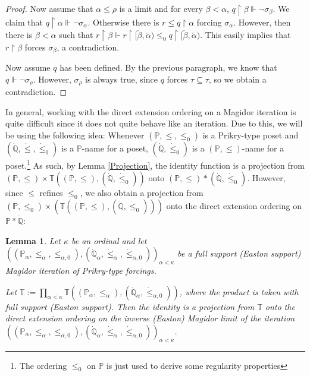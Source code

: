 \documentclass[a4paper]{amsart}
\theoremstyle{definition}
\theoremstyle{remark}
\theoremstyle{plain}
\newtheorem{mylem}[mydef]{Lemma}
\numberwithin{mydef}{section}
\newcommand{\dP}{\mathbb{P}}
\newcommand{\dQ}{\mathbb{Q}}
\newcommand{\dT}{\mathbb{T}}
\newcommand{\uhr}{\upharpoonright}
\begin{document}
\begin{proof}
		Now assume that $\alpha\leq\rho$ is a limit and for every $\beta<\alpha$, $q\uhr\beta\Vdash\neg\sigma_{\beta}$. We claim that $q\uhr\alpha\Vdash\neg\sigma_{\alpha}$. Otherwise there is $r\leq q\uhr\alpha$ forcing $\sigma_{\alpha}$. However, then there is $\beta<\alpha$ such that $r\uhr\beta\Vdash r\uhr[\check{\beta},\check{\alpha})\leq_0 q\uhr[\check{\beta},\check{\alpha})$. This easily implies that $r\uhr\beta$ forces $\sigma_{\beta}$, a contradiction.
		
		Now assume $q$ has been defined. By the previous paragraph, we know that $q\Vdash\neg\sigma_{\rho}$. However, $\sigma_{\rho}$ is always true, since $q$ forces $\tau\subseteq\tau$, so we obtain a contradiction.
	\end{proof}
	
	In general, working with the direct extension ordering on a Magidor iteration is quite difficult since it does not quite behave like an iteration. Due to this, we will be using the following idea: Whenever $(\dP,\leq,\leq_0)$ is a Prikry-type poset and $(\dot{\dQ},\dot{\leq},\dot{\leq}_0)$ is a $\dP$-name for a poset, $(\dot{\dQ},\dot{\leq}_0)$ is a $(\dP,\leq)$-name for a poset.\footnote{The ordering $\leq_0$ on $\dP$ is just used to derive some regularity properties} As such, by Lemma \ref{Projection}, the identity function is a projection from $(\dP,\leq)\times\dT((\dP,\leq),(\dot{\dQ},\dot{\leq}_0))$ onto $(\dP,\leq)*(\dot{\dQ},\dot{\leq}_0)$. However, since $\leq$ refines $\leq_0$, we also obtain a projection from $(\dP,\leq_0)\times(\dT((\dP,\leq),(\dot{\dQ},\dot{\leq}_0)))$ onto the direct extension ordering on $\dP*\dot{\dQ}$:
	
	\begin{mylem}\label{TermspaceMagidor}
		Let $\kappa$ be an ordinal and let  $((\dP_{\alpha},\leq_{\alpha},\leq_{\alpha,0}),(\dot{\dQ}_{\alpha},\dot{\leq}_{\alpha},\dot{\leq}_{\alpha,0}))_{\alpha<\kappa}$ be a full support (Easton support) Magidor iteration of Prikry-type forcings.
		
		Let $\dT:=\prod_{\alpha<\kappa}\dT((\dP_{\alpha},\leq_{\alpha}),(\dot{\dQ}_{\alpha},\dot{\leq}_{\alpha,0}))$, where the product is taken with full support (Easton support). Then the identity is a projection from $\dT$ onto the direct extension ordering on the inverse (Easton) Magidor limit of the iteration $((\dP_{\alpha},\leq_{\alpha},\leq_{\alpha,0}),(\dot{\dQ}_{\alpha},\dot{\leq}_{\alpha},\dot{\leq}_{\alpha,0}))_{\alpha<\kappa}$.
	\end{mylem}
	
\end{document}
